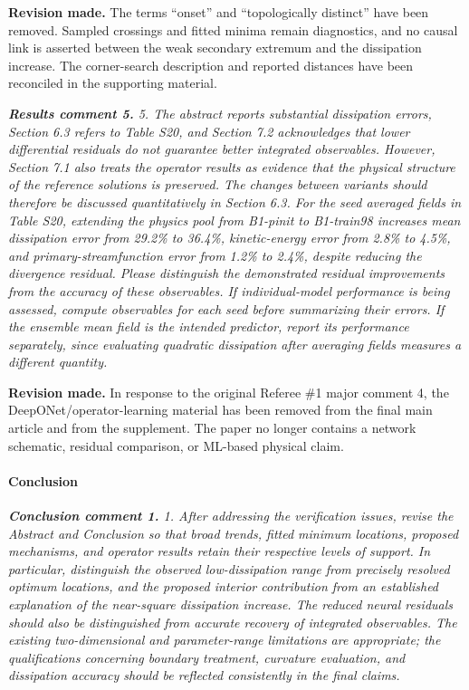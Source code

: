 \documentclass[11pt,a4paper]{article}
\newcommand{\qcomment}[1]{\textcolor{deepblue}{\itshape #1}}
\newcommand{\revwork}[1]{\textbf{\textcolor{revgreen}{#1}}}
\begin{document}
\noindent\revwork{Revision made.} The terms ``onset'' and ``topologically distinct'' have been removed. Sampled crossings and fitted minima remain diagnostics, and no causal link is asserted between the weak secondary extremum and the dissipation increase. The corner-search description and reported distances have been reconciled in the supporting material.

\medskip
\noindent\qcomment{\textbf{Results comment 5.} 5. The abstract reports substantial dissipation errors, Section 6.3 refers to Table S20, and Section 7.2 acknowledges that lower differential residuals do not guarantee better integrated observables. However, Section 7.1 also treats the operator results as evidence that the physical structure of the reference solutions is preserved. The changes between variants should therefore be discussed quantitatively in Section 6.3. For the seed averaged fields in Table S20, extending the physics pool from B1-pinit to B1-train98 increases mean dissipation error from 29.2\% to 36.4\%, kinetic-energy error from 2.8\% to 4.5\%, and primary-streamfunction error from 1.2\% to 2.4\%, despite reducing the divergence residual. Please distinguish the demonstrated residual improvements from the accuracy of these observables. If individual-model performance is being assessed, compute observables for each seed before summarizing their errors. If the ensemble mean field is the intended predictor, report its performance separately, since evaluating quadratic dissipation after averaging fields measures a different quantity.}

\noindent\revwork{Revision made.} In response to the original Referee \#1 major comment 4, the DeepONet/operator-learning material has been removed from the final main article and from the supplement. The paper no longer contains a network schematic, residual comparison, or ML-based physical claim.

\medskip
\paragraph{Conclusion}

\medskip
\noindent\qcomment{\textbf{Conclusion comment 1.} 1. After addressing the verification issues, revise the Abstract and Conclusion so that broad trends, fitted minimum locations, proposed mechanisms, and operator results retain their respective levels of support. In particular, distinguish the observed low-dissipation range from precisely resolved optimum locations, and the proposed interior contribution from an established explanation of the near-square dissipation increase. The reduced neural residuals should also be distinguished from accurate recovery of integrated observables. The existing two-dimensional and parameter-range limitations are appropriate; the qualifications concerning boundary treatment, curvature evaluation, and dissipation accuracy should be reflected consistently in the final claims.}
\end{document}
